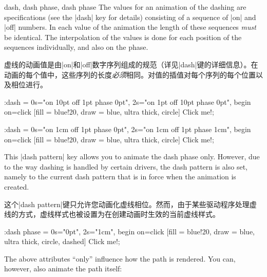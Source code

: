 \begin{tikzanimateattribute}{dash, dash phase, dash phase}
    The values for an animation of the dashing are specifications (see the
    |dash| key for details) consisting of a sequence of |on| and |off| numbers.
    In each value of the animation the length of these sequences \emph{must} be
    identical. The interpolation of the values is done for each position of the
    sequences individually, and also on the phase.
    
    虚线的动画值是由|on|和|off|数字序列组成的规范（详见|dash|键的详细信息）。在动画的每个值中，这些序列的长度\emph{必须}相同。对值的插值对每个序列的每个位置以及相位进行。


\begin{codeexample}[
    preamble={\usetikzlibrary{animations}},
    animation list={0.5,1,1.5,2},
]
\tikz \node :dash = { 0s="on 10pt off 1pt  phase 0pt",
                      2s="on 1pt  off 10pt phase 0pt", begin on=click}
  [fill = blue!20, draw = blue, ultra thick, circle] {Click me!};
\end{codeexample}
\begin{codeexample}[
    preamble={\usetikzlibrary{animations}},
    animation list={0.5,1,1.5,2},
]
\tikz \node :dash = { 0s="on 1cm off 1pt phase 0pt",
                      2s="on 1cm off 1pt phase 1cm", begin on=click}
  [fill = blue!20, draw = blue, ultra thick, circle] {Click me!};
\end{codeexample}

    This |dash pattern| key allows you to animate the dash phase only. However,
    due to the way dashing is handled by certain drivers, the dash pattern is
    also set, namely to the current dash pattern that is in force when the
    animation is created.
    
    这个|dash pattern|键只允许您动画化虚线相位。然而，由于某些驱动程序处理虚线的方式，虚线样式也被设置为在创建动画时生效的当前虚线样式。


\begin{codeexample}[
    preamble={\usetikzlibrary{animations}},
    animation list={0.5,1,1.5,2},
]
\tikz \node :dash phase = { 0s="0pt", 2s="1cm", begin on=click}
  [fill = blue!20, draw = blue, ultra thick, circle, dashed] {Click me!};
\end{codeexample}
\end{tikzanimateattribute}

The above attributes ``only'' influence how the path is rendered. You can,
however, also animate the path itself:

